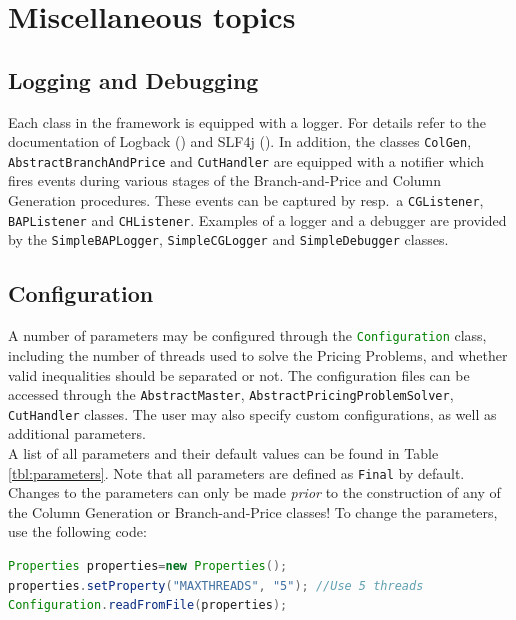 \documentclass[a4paper]{article}
\newenvironment{myblock}[1]{%
    \tcolorbox[beamer,%
    noparskip,breakable,
    colback=lightBlueCodeBlock,colframe=darkBlueCodeBlock,%
    colbacklower=darkBlueCodeBlock!75!lightBlueCodeBlock,%
    coltitle=blueTitleCodeBlock,
    title=#1]}%
    {\endtcolorbox}
\newcommand{\code}[1]{\lstinline[language=java, style=seminar]!#1!}
\begin{document}
\section{Miscellaneous topics}

\subsection{Logging and Debugging}
Each class in the framework is equipped with a logger. For details refer to the documentation of Logback (\cite{logback}) and SLF4j (\cite{slf4j}). In addition, the classes \code{ColGen}, \code{AbstractBranchAndPrice} and \code{CutHandler} are equipped with a notifier which fires events during various stages of the Branch-and-Price and Column Generation procedures. These events can be captured by resp.\ a \code{CGListener}, \code{BAPListener} and \code{CHListener}. Examples of a logger and a debugger are provided by the \code{SimpleBAPLogger}, \code{SimpleCGLogger} and \code{SimpleDebugger} classes.

\subsection{Configuration}
A number of parameters may be configured through the \code{Configuration} class, including the number of threads used to solve the Pricing Problems, and whether valid inequalities should be separated or not. The configuration files can be accessed through the \code{AbstractMaster}, \code{AbstractPricingProblemSolver}, \code{CutHandler} classes. The user may also specify custom configurations, as well as additional parameters.\\
A list of all parameters and their default values can be found in Table \ref{tbl:parameters}. Note that all parameters are defined as \code{Final} by default. Changes to the parameters can only be made \emph{prior} to the construction of any of the Column Generation or Branch-and-Price classes! To change the parameters, use the following code:
\begin{myblock}{Example on how to change parameter values}
\begin{lstlisting}[language=java, style=eclipseArticle, xleftmargin=2em]
Properties properties=new Properties();
properties.setProperty("MAXTHREADS", "5"); //Use 5 threads
Configuration.readFromFile(properties);
\end{lstlisting}
\end{myblock}
\end{document}
